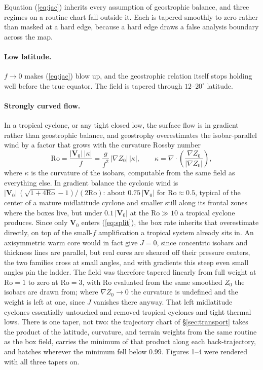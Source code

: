 \documentclass[11pt]{article}
\begin{document}
Equation (\ref{eq:jac}) inherits every assumption of geostrophic balance, and three regimes on a routine chart fall outside it. Each is tapered smoothly to zero rather than masked at a hard edge, because a hard edge draws a false analysis boundary across the map.

\paragraph{Low latitude.} $f \to 0$ makes (\ref{eq:jac}) blow up, and the geostrophic relation itself stops holding well before the true equator. The field is tapered through $12$--$20^\circ$ latitude.

\paragraph{Strongly curved flow.} In a tropical cyclone, or any tight closed low, the surface flow is in gradient rather than geostrophic balance, and geostrophy overestimates the isobar-parallel wind by a factor that grows with the curvature Rossby number
\begin{equation}
\mathrm{Ro} = \frac{|\mathbf{V}_0|\,|\kappa|}{f} = \frac{g}{f^2}\,|\nabla Z_0|\,|\kappa|,
\qquad
\kappa = \nabla\cdot\!\left(\frac{\nabla Z_0}{|\nabla Z_0|}\right),
\label{eq:ro}
\end{equation}
where $\kappa$ is the curvature of the isobars, computable from the same field as everything else. In gradient balance the cyclonic wind is $|\mathbf{V}_0|\,(\sqrt{1+4\mathrm{Ro}}-1)/(2\mathrm{Ro})$: about $0.75\,|\mathbf{V}_0|$ for $\mathrm{Ro} \approx 0.5$, typical of the center of a mature midlatitude cyclone and smaller still along its frontal zones where the boxes live, but under $0.1\,|\mathbf{V}_0|$ at the $\mathrm{Ro} \gg 10$ a tropical cyclone produces. Since only $\mathbf{V}_0$ enters (\ref{eq:split}), the box rate inherits that overestimate directly, on top of the small-$f$ amplification a tropical system already sits in. An axisymmetric warm core would in fact give $J = 0$, since concentric isobars and thickness lines are parallel, but real cores are sheared off their pressure centers, the two families cross at small angles, and with gradients this steep even small angles pin the ladder. The field was therefore tapered linearly from full weight at $\mathrm{Ro} = 1$ to zero at $\mathrm{Ro} = 3$, with $\mathrm{Ro}$ evaluated from the same smoothed $Z_0$ the isobars are drawn from; where $\nabla Z_0 \to 0$ the curvature is undefined and the weight is left at one, since $J$ vanishes there anyway. That left midlatitude cyclones essentially untouched and removed tropical cyclones and tight thermal lows. There is one taper, not two: the trajectory chart of \S\ref{sec:transport} takes the product of the latitude, curvature, and terrain weights from the same routine as the box field, carries the minimum of that product along each back-trajectory, and hatches wherever the minimum fell below $0.99$. Figures 1--4 were rendered with all three tapers on.
\end{document}
